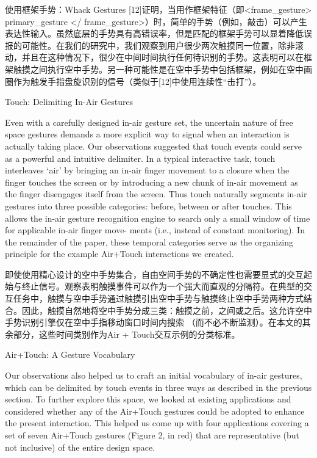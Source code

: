 使用框架手势：Whack Gestures [12]证明，当用作框架特征（即<frame_gesture> primary_gesture </ frame_gesture>）时，简单的手势（例如，敲击）可以产生表达性输入。虽然底层的手势具有高错误率，但是匹配的框架手势可以显着降低误报的可能性。在我们的研究中，我们观察到用户很少两次触摸同一位置，除非滚动，并且在这种情况下，很少在中间时间执行任何待识别的手势。这表明可以在框架触摸之间执行空中手势。另一种可能性是在空中手势中包括框架，例如在空中画圈作为触发手指盘旋识别的信号（类似于[12]中使用连续性“击打”）。

Touch: Delimiting In-Air Gestures

Even with a carefully designed in-air gesture set, the uncertain nature of free space gestures demands a more explicit way to signal when an interaction is actually taking place. Our observations suggested that touch events could serve as a powerful and intuitive delimiter. In a typical interactive task, touch interleaves ‘air’ by bringing an in-air finger movement to a closure when the finger touches the screen or by introducing a new chunk of in-air
movement as the finger disengages itself from the screen. Thus touch naturally segments in-air gestures into three possible categories: before, between or after touches. This allows the in-air gesture recognition engine to search only a small window of time for applicable in-air finger move-
ments (i.e., instead of constant monitoring). In the remainder of the paper, these temporal categories serve as the organizing principle for the example Air+Touch interactions we created.

即使使用精心设计的空中手势集合，自由空间手势的不确定性也需要显式的交互起始与终止信号。观察表明触摸事件可以作为一个强大而直观的分隔符。在典型的交互任务中，触摸与空中手势通过触摸引出空中手势与触摸终止空中手势两种方式结合。因此，触摸自然地将空中手势分成三类：触摸之前，之间或之后。这允许空中手势识别引擎仅在空中手指移动窗口时间内搜索 （而不必不断监测）。在本文的其余部分，这些时间类别作为Air + Touch交互示例的分类标准。

Air+Touch: A Gesture Vocabulary

Our observations also helped us to craft an initial vocabulary of in-air gestures, which can be delimited by touch events in three ways as described in the previous section. To further explore this space, we looked at existing applications and considered whether any of the Air+Touch gestures could be adopted to enhance the present interaction. This helped us come up with four applications covering a set of seven Air+Touch gestures (Figure 2, in red) that are representative (but not inclusive) of the entire design space.


